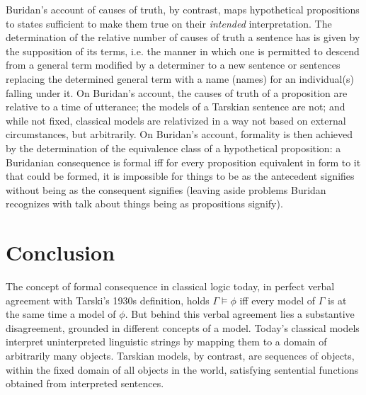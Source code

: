 \documentclass[]{article}
\begin{document}
Buridan's account of causes of truth, by contrast, maps hypothetical propositions to states sufficient to make them true on their \textit{intended} interpretation. The determination of the relative number of causes of truth a sentence has is given by the supposition of its terms, i.e. the manner in which one is permitted to descend from a general term modified by a determiner to a new sentence or sentences replacing the determined general term with a name (names) for an individual(s) falling under it. On Buridan's account, the causes of truth of a proposition are relative to a time of utterance; the models of a Tarskian sentence are not; and while not fixed, classical models are relativized in a way not based on external circumstances, but arbitrarily. On Buridan's account, formality is then achieved by the determination of the equivalence class of a hypothetical proposition: a Buridanian consequence is formal iff for every proposition equivalent in form to it that could be formed, it is impossible for things to be as the antecedent signifies without being as the consequent signifies (leaving aside problems Buridan recognizes with talk about things being as propositions signify).

\section{Conclusion}
The concept of formal consequence in classical logic today, in perfect verbal agreement with Tarski's 1930s definition, holds $\Gamma \models \phi$ iff every model of $\Gamma$ is at the same time a model of $\phi$. But behind this verbal agreement lies a substantive disagreement, grounded in different concepts of a model. Today's classical models interpret uninterpreted linguistic strings by mapping them to a domain of arbitrarily many objects. Tarskian models, by contrast, are sequences of objects, within the fixed domain of all objects in the world, satisfying sentential functions obtained from interpreted sentences.
\end{document}
